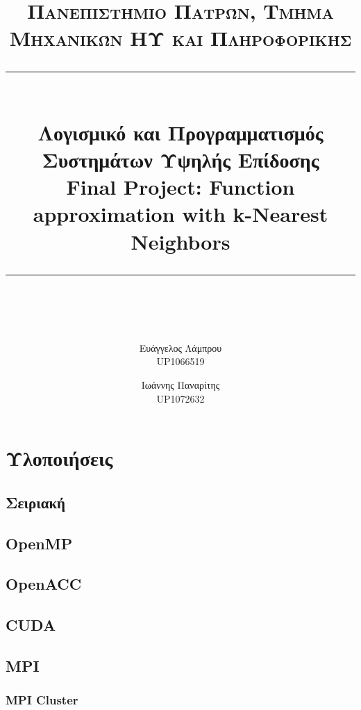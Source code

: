 \documentclass[11pt]{scrartcl} %
\title{	
	\normalfont\normalsize
	\textsc{Πανεπιστήμιο Πατρών, Τμήμα Μηχανικών ΗΥ και Πληροφορικής}\\ %
	\vspace{25pt} %
	\rule{\linewidth}{0.5pt}\\ %
	\vspace{20pt} %
    {\Large Λογισμικό και Προγραμματισμός Συστημάτων Υψηλής Επίδοσης \\ \textbf{Final Project:} Function approximation with k-Nearest Neighbors}\\ %
	\vspace{12pt} %
	\rule{\linewidth}{2pt}\\ %
	\vspace{12pt} %
}
\author{Ευάγγελος Λάμπρου \\UP1066519 \and Ιωάννης Παναρίτης \\UP1072632} %
\date{} %
\begin{document}
\maketitle 


\section{Υλοποιήσεις}

\subsection{Σειριακή}
\subsection{OpenMP}
\subsection{OpenACC}
\subsection{CUDA}
\subsection{MPI}
\subsubsection{MPI Cluster}


\end{document}
